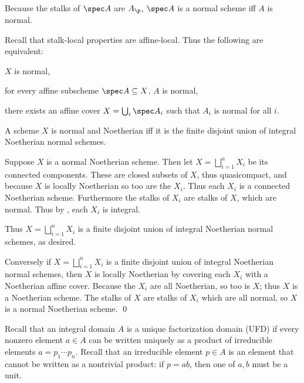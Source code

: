 Because the stalks of $\spec A$ are $A_\p$, $\spec A$ is a normal scheme iff $A$ is normal.

\bremark

    Recall that stalk-local properties are affine-local.
    Thus the following are equivalent:
    \benum
        \item $X$ is normal,
        \item for every affine subscheme $\spec A\subseteq X$, $A$ is normal,
        \item there exists an affine cover $X=\bigcup_i\spec A_i$ such that $A_i$ is normal for all $i$.
    \eenum

\eremark

\bprop

    A scheme $X$ is normal and Noetherian iff it is the finite disjoint union of integral Noetherian normal schemes.

\eprop

\bproof

    Suppose $X$ is a normal Noetherian scheme.
    Then let $X=\bigsqcup_{i=1}^nX_i$ be its connected components.
    These are closed subsets of $X$, thus quasicompact, and because $X$ is locally Noetherian so too are the $X_i$.
    Thus each $X_i$ is a connected Noetherian scheme.
    Furthermore the stalks of $X_i$ are stalks of $X$, which are normal.
    Thus by , each $X_i$ is integral.

    Thus $X=\bigsqcup_{i=1}^nX_i$ is a finite disjoint union of integral Noetherian normal schemes, as desired.

    Conversely if $X=\bigsqcup_{i=1}^nX_i$ is a finite disjoint union of integral Noetherian normal schemes, then $X$ is locally Noetherian by
    covering each $X_i$ with a Noetherian affine cover.
    Because the $X_i$ are all Noetherian, so too is $X$; thus $X$ is a Noetherian scheme.
    The stalks of $X$ are stalks of $X_i$ which are all normal, so $X$ is a normal Noetherian scheme.
    \qed

\eproof

Recall that an integral domain $A$ is a {\emphcolor unique factorization domain} ({\emphcolor UFD}) if every nonzero element $a\in A$ can be written uniquely
as a product of irreducible elements $a=p_1\cdots p_n$.
Recall that an irreducible element $p\in A$ is an element that cannot be written as a nontrivial product: if $p=ab$, then one of $a,b$ must be a unit.

\bdefn

